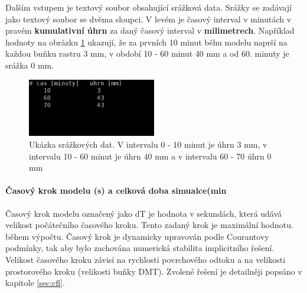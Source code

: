 Dalším vstupem je textový soubor obsahující srážková data. 
% 
% 
% 
Srážky se zadávají jako textový soubor se dvěma sloupci. V levém je časový interval v minutách v pravém \textbf{kumulativní úhrn} za daný časový interval v \textbf{milimetrech}. Například hodnoty na obrázku \ref{fig:srazkovysoubor} ukazují, že za prvních 10 minut běhu modelu naprší  na každou buňku rastru 3 mm, v období 10 - 60 minut 40 mm a od 60. minuty je srážka 0 mm. 
\begin{figure}
  \centering
  \includegraphics[width=0.5\textwidth]{./img/srazka.png}
  \caption{Ukázka srážkových dat. V intervalu 0 - 10 minut je úhrn 3 mm, v intervalu 10 - 60 minut je úhrn 40 mm a v intervalu 60 - 70 úhrn 0 mm}
  \label{fig:srazkovysoubor}
\end{figure}


\paragraph{Časový krok modelu (s) a celková doba simualce(min} \label{sec:vstupkrok}

Časový krok modelu označený jako \acs{dT} je hodnota v sekundách, která udává velikost počátečního časového kroku. Tento zadaný krok je maximální hodnotu. během výpočtu. Časový krok je dynamicky upravován podle Courantovy podmínky, tak aby bylo zachována numerická stabilita implicitního řešení. Velikost časového kroku závisí na rychlosti povrchového odtoku a na velikosti prostorového kroku (velikosti buňky DMT). Zvolené řešení je detailněji popsáno v kapitole \ref{sec:cfl}. %


